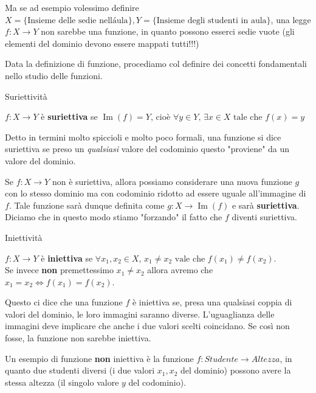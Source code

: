 \documentclass[12pt]{report}
\begin{document}
	Ma se ad esempio volessimo definire $X = \{\text{Insieme delle sedie nell\'aula}\}, Y = \{\text{Insieme degli studenti in aula}\}$, una legge $f: X \to Y$ non sarebbe una funzione, in quanto possono esserci sedie vuote (gli elementi del dominio devono essere mappati tutti!!!)
	
	Data la definizione di funzione, procediamo col definire dei concetti fondamentali nello studio delle funzioni.
	
	\begin{definizione}{Suriettività}{}
		
		$f: X \to Y$ è \textbf{suriettiva} se $\operatorname{Im}(f) = Y$, cioè $\forall y \in Y,\,\exists x \in X \text{ tale che } f(x) = y$
		
	\end{definizione}
	Detto in termini molto spiccioli e molto poco formali, una funzione si dice suriettiva se preso un \textit{qualsiasi} valore del codominio questo "proviene" da un valore del dominio.
	
	\begin{osservazione}{}{}
		
		Se $f: X \to Y$ non è suriettiva, allora possiamo considerare una nuova funzione $g$ con lo stesso dominio ma con codominio ridotto ad essere uguale all'immagine di $f$. Tale funzione sarà dunque definita come $g: X \to \operatorname{Im}(f)$ e sarà \textbf{suriettiva}. Diciamo che in questo modo stiamo "forzando" il fatto che $f$ diventi suriettiva.
		
	\end{osservazione}
	
	\begin{definizione}{Iniettività}{}
		
		$f: X \to Y$ è \textbf{iniettiva} se $\forall x_1, x_2 \in X,\, x_1 \neq x_2 \text{ vale che } f(x_1) \neq f(x_2)$.\\
		Se invece \textbf{non} premettessimo $x_1 \neq x_2$ allora avremo che $x_1 = x_2 \Leftrightarrow f(x_1) = f(x_2)$.
		
	\end{definizione}
	Questo ci dice che una funzione $f$ è iniettiva se, presa una qualsiasi coppia di valori del dominio, le loro immagini saranno diverse. L'uguaglianza delle immagini deve implicare che anche i due valori scelti coincidano. Se così non fosse, la funzione non sarebbe iniettiva.
	
	Un esempio di funzione \textbf{non} iniettiva è la funzione $f: Studente \to Altezza$, in quanto due studenti diversi (i due valori $x_1, x_2$ del dominio) possono avere la stessa altezza (il singolo valore $y$ del codominio).
	
\end{document}
